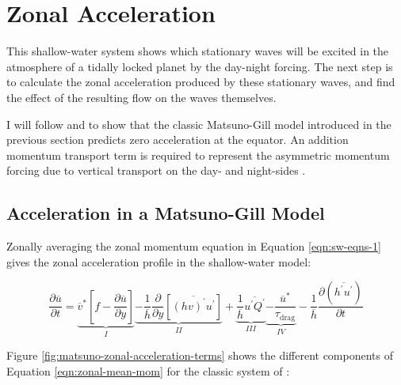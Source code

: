 \section{Zonal Acceleration}\label{sec:zonal-acceleration}

This shallow-water system shows which stationary waves will be excited in the atmosphere of a tidally locked planet by the day-night forcing. The next step is to calculate the zonal acceleration produced by these stationary waves, and find the effect of the resulting flow on the waves themselves.

I will follow \citet{showman2010superrotation} and \citet{showman2011superrotation} to show that the classic Matsuno-Gill model introduced in the previous section predicts zero acceleration at the equator. An addition momentum transport term is required to represent the asymmetric momentum forcing due to vertical transport on the day- and night-sides \citet{shell2004superrotation}.


\subsection{Acceleration in a Matsuno-Gill Model}

Zonally averaging the zonal momentum equation in Equation \ref{eqn:sw-eqns-1} \citep{thuburn1999zonalmean} \citep{showman2010superrotation} gives the zonal acceleration profile in the shallow-water model:

\begin{equation}\label{eqn:zonal-mean-mom}
  \frac { \partial \overline { u } } { \partial t } = \underbrace { \overline { v } ^ { * } \left[ f - \frac { \partial \overline { u } } { \partial y } \right] } _ { I } \underbrace { - \frac { 1 } { \overline { h } } \frac { \partial } { \partial y } \left[ \overline { ( h v ) ^ { \prime } u ^ { \prime } } \right] } _ { I I } + \underbrace {  \frac { 1 } { \overline { h } } \overline { u ^ { \prime } Q ^ { \prime } } } _ { I I I } \underbrace { - \frac { \overline { u } ^ { * } } { \tau _ { \mathrm { drag } } } } _ { I V } - \frac { 1 } { \overline { h } } \frac { \partial \left( \overline { h ^ { \prime } u ^ { \prime } } \right) } { \partial t }
\end{equation}

Figure \ref{fig:matsuno-zonal-acceleration-terms} shows the different components of Equation \ref{eqn:zonal-mean-mom} for the classic system of \citet{matsuno1966quasi}:

